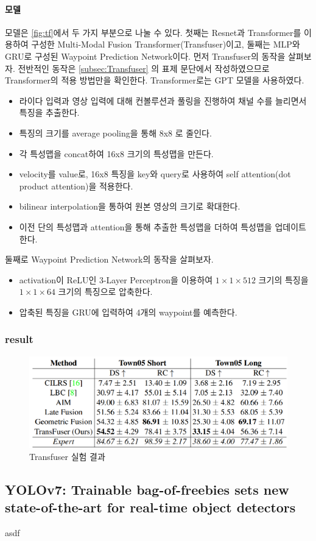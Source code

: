 \paragraph*{모델}
모델은 \autoref{fig:tf}에서 두 가지 부분으로 나눌 수 있다.
첫째는 Resnet과 Transformer를 이용하여 구성한 Multi-Modal Fusion Transformer(Transfuser)이고,
둘째는 MLP와 GRU로 구성된 Waypoint Prediction Network이다.
먼저 Transfuser의 동작을 살펴보자.
전반적인 동작은 \autoref{subsec:Transfuser} 의 표제 문단에서 작성하였으므로 Transformer의 적용 방법만을 확인한다.
Transformer로는 GPT 모델을 사용하였다.
\begin{itemize}\tightlist
    \item 라이다 입력과 영상 입력에 대해 컨볼루션과 풀링을 진행하여 채널 수를 늘리면서 특징을 추출한다.
    \item 특징의 크기를 average pooling을 통해 8x8 로 줄인다.
    \item 각 특성맵을 concat하여 16x8 크기의 특성맵을 만든다.
    \item velocity를 value로, 16x8 특징을 key와 query로 사용하여 self attention(dot product attention)을 적용한다.
    \item bilinear interpolation을 통하여 원본 영상의 크기로 확대한다.
    \item 이전 단의 특성맵과 attention을 통해 추출한 특성맵을 더하여 특성맵을 업데이트한다.
\end{itemize}
둘째로 Waypoint Prediction Network의 동작을 살펴보자.
\begin{itemize}\tightlist
    \item activation이 ReLU인 3-Layer Perceptron을 이용하여
    $1 \times 1 \times 512$ 크기의 특징을
    $1 \times 1 \times 64$ 크기의 특징으로 압축한다.
    \item 압축된 특징을 GRU에 입력하여 4개의 waypoint를 예측한다.
\end{itemize}

\subsubsection{result}
\begin{figure}[htp]
    \centering
    \includegraphics[width=0.8\linewidth]{figures/Transfuser_result.png}
    \caption{Transfuser 실험 결과}
    \label{fig:tf_res}
\end{figure}

\subsection{YOLOv7: Trainable bag-of-freebies sets new state-of-the-art for real-time object detectors}{\label{subsec:yolov7}}

asdf